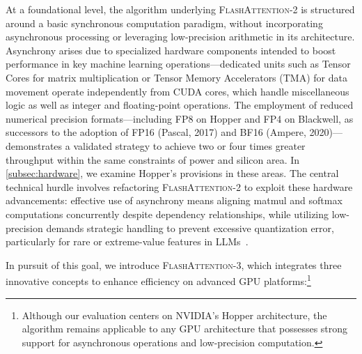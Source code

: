 At a foundational level, the algorithm underlying \textsc{FlashAttention-2} is structured around a basic synchronous computation paradigm, without incorporating asynchronous processing or leveraging low-precision arithmetic in its architecture. Asynchrony arises due to specialized hardware components intended to boost performance in key machine learning operations—dedicated units such as Tensor Cores for matrix multiplication or Tensor Memory Accelerators (TMA) for data movement operate independently from CUDA cores, which handle miscellaneous logic as well as integer and floating-point operations. The employment of reduced numerical precision formats—including FP8 on Hopper and FP4 on Blackwell, as successors to the adoption of FP16 (Pascal, 2017) and BF16 (Ampere, 2020)—demonstrates a validated strategy to achieve two or four times greater throughput within the same constraints of power and silicon area. In \cref{subsec:hardware}, we examine Hopper's provisions in these areas. The central technical hurdle involves refactoring \textsc{FlashAttention-2} to exploit these hardware advancements: effective use of asynchrony means aligning matmul and softmax computations concurrently despite dependency relationships, while utilizing low-precision demands strategic handling to prevent excessive quantization error, particularly for rare or extreme-value features in LLMs~\citep{dettmers2208llm, sun2024massive}.

In pursuit of this goal, we introduce \textsc{FlashAttention-3}, which integrates three innovative concepts to enhance efficiency on advanced GPU platforms:\footnote{Although our evaluation centers on NVIDIA's Hopper architecture, the algorithm remains applicable to any GPU architecture that possesses strong support for asynchronous operations and low-precision computation.}

